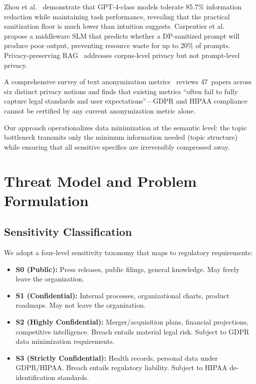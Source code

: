 \documentclass[sigconf,anonymous,review,balance=false]{acmart}
\begin{document}
Zhou et al.~\cite{zhou2025} demonstrate that GPT-4-class models tolerate 85.7\% information redaction while maintaining task performance, revealing that the practical sanitization floor is much lower than intuition suggests.
Carpentier et al.~\cite{carpentier2024} propose a middleware SLM that predicts whether a DP-sanitized prompt will produce poor output, preventing resource waste for up to 20\% of prompts.
Privacy-preserving RAG~\cite{zeng2024, syntheticrag2024, dprag2024} addresses corpus-level privacy but not prompt-level privacy.

A comprehensive survey of text anonymization metrics~\cite{metricssurvey2025} reviews 47~papers across six distinct privacy notions and finds that existing metrics ``often fail to fully capture legal standards and user expectations''---GDPR and HIPAA compliance cannot be certified by any current anonymization metric alone.

Our approach operationalizes data minimization at the semantic level: the topic bottleneck transmits only the minimum information needed (topic structure) while ensuring that all sensitive specifics are irreversibly compressed away.

\section{Threat Model and Problem Formulation}
\label{sec:threat}

\subsection{Sensitivity Classification}
\label{sec:sensitivity}

We adopt a four-level sensitivity taxonomy that maps to regulatory requirements:

\begin{itemize}
\item \textbf{S0 (Public):} Press releases, public filings, general knowledge. May freely leave the organization.
\item \textbf{S1 (Confidential):} Internal processes, organizational charts, product roadmaps. May not leave the organization.
\item \textbf{S2 (Highly Confidential):} Merger/acquisition plans, financial projections, competitive intelligence. Breach entails material legal risk. Subject to GDPR data minimization requirements.
\item \textbf{S3 (Strictly Confidential):} Health records, personal data under GDPR/HIPAA. Breach entails regulatory liability. Subject to HIPAA de-identification standards.
\end{itemize}
\end{document}

